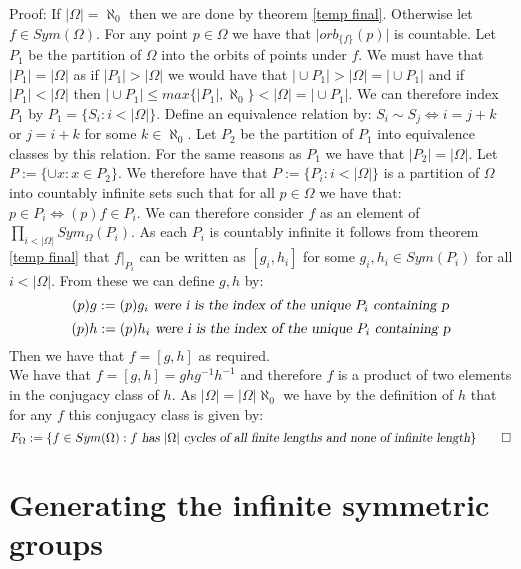 \documentclass{report}
\begin{document}
Proof: If $\vert \Omega \vert = \aleph_0$ then we are done by theorem \ref{temp final}. Otherwise let $f \in Sym(\Omega)$. For any point $p\in \Omega$ we have that $\vert orb_{\{f\}}(p) \vert$ is countable. Let $P_1$ be the partition of $\Omega$ into the orbits of points under $f$. We must have that $\vert P_1 \vert = \vert \Omega \vert$ as if $\vert P_1 \vert > \vert \Omega \vert$ we would have that $\vert \cup P_1 \vert > \vert \Omega \vert = \vert \cup P_1 \vert$ and if $\vert P_1 \vert < \vert \Omega \vert$ then $\vert \cup P_1 \vert \leq max\{ \vert P_1 \vert, \aleph_0\} < \vert \Omega \vert = \vert \cup P_1 \vert$. We can therefore index $P_1$ by $P_1 = \{S_i:i<\vert \Omega \vert\}$. Define an equivalence relation by: $S_i \sim S_j \iff i=j+k$ or $j=i+k$ for some $k \in \aleph_0$. Let $P_2$ be the partition of $P_1$ into equivalence classes by this relation. For the same reasons as $P_1$ we have that $\vert P_2 \vert = \vert \Omega \vert$. Let $P:= \{\cup x:x\in P_2\}$. We therefore have that $P:= \{P_i:i<\vert \Omega \vert\}$ is a partition of $\Omega$ into countably infinite sets such that for all $p\in \Omega$ we have that: $p \in P_i \iff (p)f \in P_i$. We can therefore consider $f$ as an element of $\prod_{i<\vert \Omega \vert} Sym_{\Omega}(P_i)$. As each $P_i$ is countably infinite it follows from theorem \ref{temp final} that $f\vert_{P_i}$ can be written as $[g_i,h_i]$ for some $g_i,h_i \in Sym(P_i)$ for all $i < \vert \Omega \vert$. From these we can define $g,h$ by:
$$(p)g:= (p)g_i \textsl{ were i is the index of the unique }P_i \textsl{ containing p}$$
$$(p)h:= (p)h_i \textsl{ were i is the index of the unique }P_i \textsl{ containing p}$$
Then we have that $f = [g,h]$ as required.\\
We have that $f = [g,h] = ghg^{-1}h^{-1}$ and therefore $f$ is a product of two elements in the conjugacy class of $h$. As \(|\Omega|=|\Omega|\aleph_0\) we have by the definition of $h$ that for any $f$ this conjugacy class is given by: $$F_{\Omega} := \{f \in Sym(\Omega): f\textsl{ has }\vert \Omega \vert \textsl{ cycles of all finite lengths and none of infinite length}\} \qed$$
\chapter{Generating the infinite symmetric groups}
\end{document}
